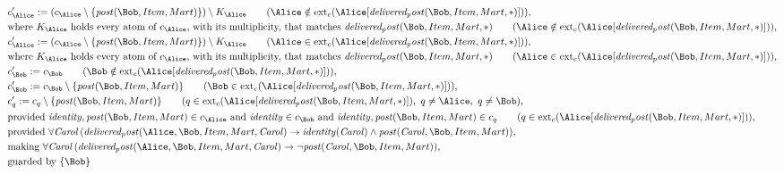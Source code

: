 \begin{align*}
&
c'_
{
\Alice
}
 := 
(c_
{
\Alice
}
 \setminus 
\{
\mathit{
post
}
(
\Bob
,
Item
,
Mart
)
\}
) \setminus K_
{
\Alice
}
 \qquad (
\Alice
 \notin 
\mathrm{ext}_c(
\Alice
[
\mathit{
delivered_post
}
(
\Bob
,
Item
,
Mart
,
\ast
)
]
)
)
,\\
&
\text{where } K_
{
\Alice
}
 \text{ holds every atom of } c_
{
\Alice
}
 \text{, with its multiplicity, that matches } 
\mathit{
delivered_post
}
(
\Bob
,
Item
,
Mart
,
\ast
)
 \qquad (
\Alice
 \notin 
\mathrm{ext}_c(
\Alice
[
\mathit{
delivered_post
}
(
\Bob
,
Item
,
Mart
,
\ast
)
]
)
)
,\\
&
c'_
{
\Alice
}
 := 
(c_
{
\Alice
}
 \setminus 
\{
\mathit{
post
}
(
\Bob
,
Item
,
Mart
)
\}
) \setminus K_
{
\Alice
}
 \qquad (
\Alice
 \in 
\mathrm{ext}_c(
\Alice
[
\mathit{
delivered_post
}
(
\Bob
,
Item
,
Mart
,
\ast
)
]
)
)
,\\
&
\text{where } K_
{
\Alice
}
 \text{ holds every atom of } c_
{
\Alice
}
 \text{, with its multiplicity, that matches } 
\mathit{
delivered_post
}
(
\Bob
,
Item
,
Mart
,
\ast
)
 \qquad (
\Alice
 \in 
\mathrm{ext}_c(
\Alice
[
\mathit{
delivered_post
}
(
\Bob
,
Item
,
Mart
,
\ast
)
]
)
)
,\\
&
c'_
{
\Bob
}
 := 
c_
{
\Bob
}
 \qquad (
\Bob
 \notin 
\mathrm{ext}_c(
\Alice
[
\mathit{
delivered_post
}
(
\Bob
,
Item
,
Mart
,
\ast
)
]
)
)
,\\
&
c'_
{
\Bob
}
 := 
c_
{
\Bob
}
 \setminus 
\{
\mathit{
post
}
(
\Bob
,
Item
,
Mart
)
\}
 \qquad (
\Bob
 \in 
\mathrm{ext}_c(
\Alice
[
\mathit{
delivered_post
}
(
\Bob
,
Item
,
Mart
,
\ast
)
]
)
)
,\\
&
c'_
q
 := 
c_
q
 \setminus 
\{
\mathit{
post
}
(
\Bob
,
Item
,
Mart
)
\}
 \qquad (
q
 \in 
\mathrm{ext}_c(
\Alice
[
\mathit{
delivered_post
}
(
\Bob
,
Item
,
Mart
,
\ast
)
]
)
,\ 
q \neq 
\Alice
,\ 
q \neq 
\Bob
)
,\\
&
\text{provided } 
\mathit{
identity
}
,
\mathit{
post
}
(
\Bob
,
Item
,
Mart
)
 \in c_
{
\Alice
}
 \text{ and } 
\mathit{
identity
}
 \in c_
{
\Bob
}
 \text{ and } 
\mathit{
identity
}
,
\mathit{
post
}
(
\Bob
,
Item
,
Mart
)
 \in c_
q
 \qquad (
q \in 
\mathrm{ext}_c(
\Alice
[
\mathit{
delivered_post
}
(
\Bob
,
Item
,
Mart
,
\ast
)
]
)
)
,\\
&
\text{provided } 
\forall 
\mathit{Carol}
\,(
\mathit{
delivered_post
}
(
\Alice
,
\Bob
,
Item
,
Mart
,
\mathit{Carol}
)
\rightarrow
\mathit{
identity
}
(
\mathit{Carol}
)
\land
\mathit{
post
}
(
\mathit{Carol}
,
\Bob
,
Item
,
Mart
)
)
,\\
&
\text{making } 
\forall 
\mathit{Carol}
\,(
\mathit{
delivered_post
}
(
\Alice
,
\Bob
,
Item
,
Mart
,
\mathit{Carol}
)
\rightarrow
\neg 
\mathit{
post
}
(
\mathit{Carol}
,
\Bob
,
Item
,
Mart
)
)
,\\
&
\text{guarded by } \{
\Bob
\}
\end{align*}
